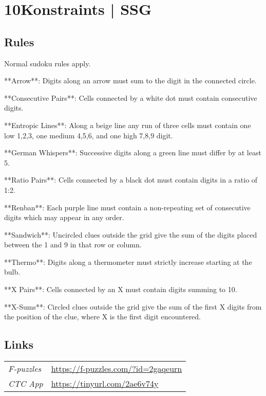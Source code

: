 \section{10Konstraints | {\normalfont SSG}}
\label{sec:35-10konstraints-ssg}

\subsection*{Rules}
\begin{markdown}
Normal sudoku rules apply.



**Arrow**: Digits along an arrow must sum to the digit in the connected circle.



**Consecutive Pairs**: Cells connected by a white dot must contain consecutive digits.



**Entropic Lines**: Along a beige line any run of three cells must contain one low {1,2,3}, one medium {4,5,6}, and one high {7,8,9} digit.



**German Whispers**: Successive digits along a green line must differ by at least 5.



**Ratio Pairs**: Cells connected by a black dot must contain digits in a ratio of 1:2.



**Renban**: Each purple line must contain a non-repeating set of consecutive digits which may appear in any order.



**Sandwich**: Uncircled clues outside the grid give the sum of the digits placed between the 1 and 9 in that row or column.



**Thermo**: Digits along a thermometer must strictly increase starting at the bulb.



**X Pairs**: Cells connected by an X must contain digits summing to 10.



**X-Sums**: Circled clues outside the grid give the sum of the first X digits from the position of the clue, where X is the first digit encountered.
\end{markdown}
\subsection*{Links}
\begin{tabularx}{\textwidth}{l X}
\emph{F-puzzles} & \url{https://f-puzzles.com/?id=2gaqeurn} \\
\emph{CTC App} & \url{https://tinyurl.com/2ae6v74y} \\
\end{tabularx}
\pagebreak
